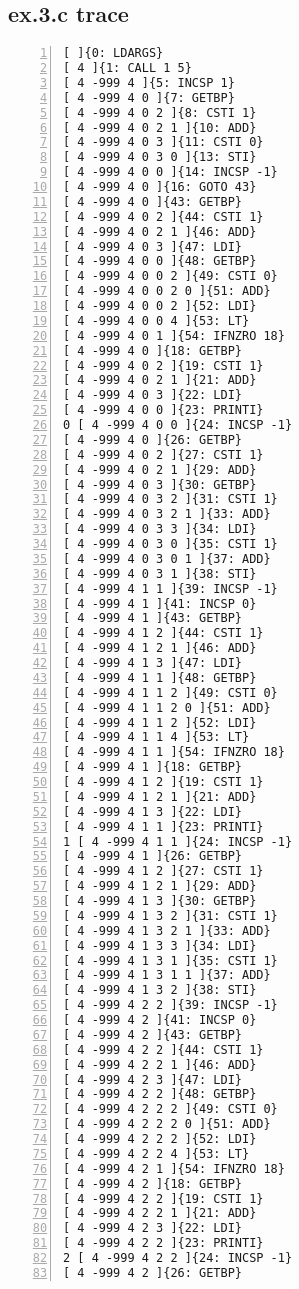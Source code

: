\documentclass[a4paper, titlepage]{article}
\begin{document}
\subsection*{ex.3.c trace}
\begin{lstlisting}[numbers=left]
[ ]{0: LDARGS}
[ 4 ]{1: CALL 1 5}
[ 4 -999 4 ]{5: INCSP 1}
[ 4 -999 4 0 ]{7: GETBP}
[ 4 -999 4 0 2 ]{8: CSTI 1}
[ 4 -999 4 0 2 1 ]{10: ADD}
[ 4 -999 4 0 3 ]{11: CSTI 0}
[ 4 -999 4 0 3 0 ]{13: STI}
[ 4 -999 4 0 0 ]{14: INCSP -1}
[ 4 -999 4 0 ]{16: GOTO 43}
[ 4 -999 4 0 ]{43: GETBP}
[ 4 -999 4 0 2 ]{44: CSTI 1}
[ 4 -999 4 0 2 1 ]{46: ADD}
[ 4 -999 4 0 3 ]{47: LDI}
[ 4 -999 4 0 0 ]{48: GETBP}
[ 4 -999 4 0 0 2 ]{49: CSTI 0}
[ 4 -999 4 0 0 2 0 ]{51: ADD}
[ 4 -999 4 0 0 2 ]{52: LDI}
[ 4 -999 4 0 0 4 ]{53: LT}
[ 4 -999 4 0 1 ]{54: IFNZRO 18}
[ 4 -999 4 0 ]{18: GETBP}
[ 4 -999 4 0 2 ]{19: CSTI 1}
[ 4 -999 4 0 2 1 ]{21: ADD}
[ 4 -999 4 0 3 ]{22: LDI}
[ 4 -999 4 0 0 ]{23: PRINTI}
0 [ 4 -999 4 0 0 ]{24: INCSP -1}
[ 4 -999 4 0 ]{26: GETBP}
[ 4 -999 4 0 2 ]{27: CSTI 1}
[ 4 -999 4 0 2 1 ]{29: ADD}
[ 4 -999 4 0 3 ]{30: GETBP}
[ 4 -999 4 0 3 2 ]{31: CSTI 1}
[ 4 -999 4 0 3 2 1 ]{33: ADD}
[ 4 -999 4 0 3 3 ]{34: LDI}
[ 4 -999 4 0 3 0 ]{35: CSTI 1}
[ 4 -999 4 0 3 0 1 ]{37: ADD}
[ 4 -999 4 0 3 1 ]{38: STI}
[ 4 -999 4 1 1 ]{39: INCSP -1}
[ 4 -999 4 1 ]{41: INCSP 0}
[ 4 -999 4 1 ]{43: GETBP}
[ 4 -999 4 1 2 ]{44: CSTI 1}
[ 4 -999 4 1 2 1 ]{46: ADD}
[ 4 -999 4 1 3 ]{47: LDI}
[ 4 -999 4 1 1 ]{48: GETBP}
[ 4 -999 4 1 1 2 ]{49: CSTI 0}
[ 4 -999 4 1 1 2 0 ]{51: ADD}
[ 4 -999 4 1 1 2 ]{52: LDI}
[ 4 -999 4 1 1 4 ]{53: LT}
[ 4 -999 4 1 1 ]{54: IFNZRO 18}
[ 4 -999 4 1 ]{18: GETBP}
[ 4 -999 4 1 2 ]{19: CSTI 1}
[ 4 -999 4 1 2 1 ]{21: ADD}
[ 4 -999 4 1 3 ]{22: LDI}
[ 4 -999 4 1 1 ]{23: PRINTI}
1 [ 4 -999 4 1 1 ]{24: INCSP -1}
[ 4 -999 4 1 ]{26: GETBP}
[ 4 -999 4 1 2 ]{27: CSTI 1}
[ 4 -999 4 1 2 1 ]{29: ADD}
[ 4 -999 4 1 3 ]{30: GETBP}
[ 4 -999 4 1 3 2 ]{31: CSTI 1}
[ 4 -999 4 1 3 2 1 ]{33: ADD}
[ 4 -999 4 1 3 3 ]{34: LDI}
[ 4 -999 4 1 3 1 ]{35: CSTI 1}
[ 4 -999 4 1 3 1 1 ]{37: ADD}
[ 4 -999 4 1 3 2 ]{38: STI}
[ 4 -999 4 2 2 ]{39: INCSP -1}
[ 4 -999 4 2 ]{41: INCSP 0}
[ 4 -999 4 2 ]{43: GETBP}
[ 4 -999 4 2 2 ]{44: CSTI 1}
[ 4 -999 4 2 2 1 ]{46: ADD}
[ 4 -999 4 2 3 ]{47: LDI}
[ 4 -999 4 2 2 ]{48: GETBP}
[ 4 -999 4 2 2 2 ]{49: CSTI 0}
[ 4 -999 4 2 2 2 0 ]{51: ADD}
[ 4 -999 4 2 2 2 ]{52: LDI}
[ 4 -999 4 2 2 4 ]{53: LT}
[ 4 -999 4 2 1 ]{54: IFNZRO 18}
[ 4 -999 4 2 ]{18: GETBP}
[ 4 -999 4 2 2 ]{19: CSTI 1}
[ 4 -999 4 2 2 1 ]{21: ADD}
[ 4 -999 4 2 3 ]{22: LDI}
[ 4 -999 4 2 2 ]{23: PRINTI}
2 [ 4 -999 4 2 2 ]{24: INCSP -1}
[ 4 -999 4 2 ]{26: GETBP}

\end{lstlisting}
\end{document}
